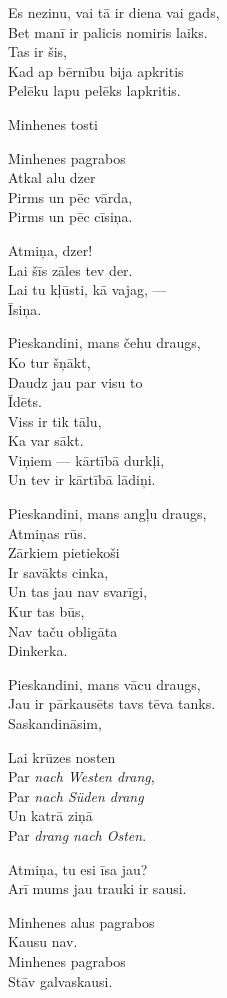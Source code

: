 \documentclass[14pt]{extarticle}
\begin{document}
Es nezinu, vai tā ir diena vai gads,\\
Bet manī ir palicis nomiris laiks.\\
Tas ir šis,\\
Kad ap bērnību bija apkritis\\
Pelēku lapu pelēks lapkritis.


\newpage

{\large \sc Minhenes tosti}

Minhenes pagrabos\\
Atkal alu dzer\\
Pirms un pēc vārda,\\
Pirms un pēc cīsiņa.

Atmiņa, dzer!\\
Lai šīs zāles tev der.\\
Lai tu kļūsti, kā vajag, ---\\
Īsiņa.

Pieskandini, mans čehu draugs,\\
Ko tur šņākt,\\
Daudz jau par visu to\\
Īdēts.\\
Viss ir tik tālu,\\
Ka var sākt.\\
Viņiem --- kārtībā durkļi,\\
Un tev ir kārtībā lādiņi.

Pieskandini, mans angļu draugs,\\
Atmiņas rūs.\\
Zārkiem pietiekoši\\
Ir savākts cinka,\\
Un tas jau nav svarīgi,\\
Kur tas būs,\\
Nav taču obligāta\\
Dinkerka.

Pieskandini, mans vācu draugs,\\
Jau ir pārkausēts tavs tēva tanks.\\
Saskandināsim,

Lai krūzes nosten\\
Par {\em nach Westen drang},\\
Par {\em nach Süden drang}\\
Un katrā ziņā\\
Par {\em drang nach Osten}.

Atmiņa, tu esi īsa jau?\\
Arī mums jau trauki ir sausi.

Minhenes alus pagrabos\\
Kausu nav.\\
Minhenes pagrabos\\
Stāv galvaskausi.
\end{document}
